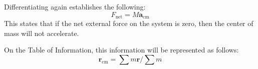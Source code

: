\documentclass{article}
\begin{document}
Differentiating again establishes the following:
\begin{equation*}
    F_{\text{net}}=M\textbf{a}_{\text{cm}}
\end{equation*}
This states that if the net external force on the system is zero, then the center of mass will not accelerate.
\begin{note}
    On the Table of Information, this information will be represented as follows:
    \begin{equation*}
        \textbf{r}_{\text{cm}} = \sum m\textbf{r} / \sum m
    \end{equation*}

\begin{centering}


\begin{tikzpicture}[x=0.75pt,y=0.75pt,yscale=-1,xscale=1]


\end{tikzpicture}
\end{centering}
\end{note}
\end{document}
